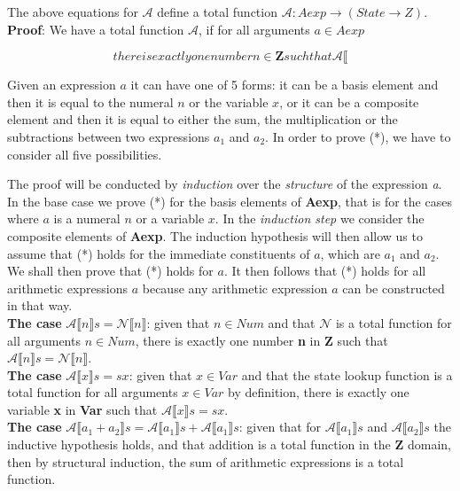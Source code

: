 \documentclass{article}
\begin{document}

The above equations for $\mathcal{A}$ define a total function $\mathcal{A}: Aexp \rightarrow (State \rightarrow Z)$. \\

\noindent \textbf{Proof}: We have a total function $\mathcal A$, if for all arguments $a \in Aexp$

\begin{equation}
  \tag{*}
  there is exactly one number n \in \textbf{Z} such that \mathcal{A} \llbracket 
  \label{eqn:Stokes}
\end{equation}

Given an expression $a$ it can have one of 5 forms: it can be a basis element and then it is equal to the numeral $n$ or the variable $x$, or it can be a composite element and then it is equal to either the sum, the multiplication or the subtractions between two expressions $a_1$ and $a_2$. In order to prove (*), we have to consider all five possibilities.

The proof will be conducted by \textit{induction} over the \textit{structure} of the expression \textit{a}. In the base case we prove (*) for the basis elements of \textbf{Aexp},
that is for the cases where $a$ is a numeral $n$ or a variable $x$. In the \textit{induction step} we consider the composite elements of \textbf{Aexp}.
The induction hypothesis will then allow us to assume that (*) holds for the immediate constituents of $a$, which are $a_1$ and $a_2$. We shall then prove that (*) holds for $a$.
It then follows that (*) holds for all arithmetic expressions $a$ because any arithmetic expression $a$ can be constructed in that way. \\

\noindent \textbf{The case} $\mathcal{A}\llbracket n \rrbracket s = \mathcal{N} \llbracket n \rrbracket$: given that $n \in Num$ and that $\mathcal{N}$ is a total function for all arguments $n \in Num$, there is exactly one number \textbf{n} in \textbf{Z}
such that $\mathcal{A}\llbracket n \rrbracket s = \mathcal{N} \llbracket n \rrbracket$. \\

\noindent \textbf{The case} $\mathcal{A}\llbracket x \rrbracket s = s x$: given that $x \in Var$ and that the state lookup function is a total function for all arguments $x \in Var$ by definition, there is exactly one variable \textbf{x} in \textbf{Var}
such that $\mathcal{A}\llbracket x \rrbracket s = s x$. \\

\noindent \textbf{The case} $\mathcal{A}\llbracket a_1 + a_2 \rrbracket s = \mathcal{A}\llbracket a_1 \rrbracket s + \mathcal{A}\llbracket a_1 \rrbracket s$:
given that for $\mathcal{A}\llbracket a_1 \rrbracket s$ and $\mathcal{A}\llbracket a_2 \rrbracket s$ the inductive hypothesis holds, and that addition is a total function in the \textbf{Z} domain, then by structural induction, the sum of arithmetic expressions is a total function.
\end{document}

